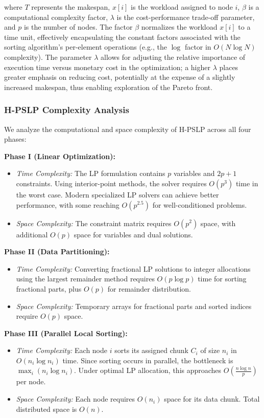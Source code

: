 \documentclass[]{interact}
\theoremstyle{plain}
\theoremstyle{definition}
\theoremstyle{remark}
\begin{document}
where $T$ represents the makespan, $x[i]$ is the workload assigned to node $i$, $\beta$ is a computational complexity factor, $\lambda$ is the cost-performance trade-off parameter, and $p$ is the number of nodes. The factor $\beta$ normalizes the workload $x[i]$ to a time unit, effectively encapsulating the constant factors associated with the sorting algorithm's per-element operations (e.g., the $\log$ factor in $O(N \log N)$ complexity). The parameter $\lambda$ allows for adjusting the relative importance of execution time versus monetary cost in the optimization; a higher $\lambda$ places greater emphasis on reducing cost, potentially at the expense of a slightly increased makespan, thus enabling exploration of the Pareto front.

\subsubsection{H-PSLP Complexity Analysis}

We analyze the computational and space complexity of H-PSLP across all four phases:

\textbf{Phase I (Linear Optimization):}
\begin{itemize}
\item \textit{Time Complexity:} The LP formulation contains $p$ variables and $2p+1$ constraints. Using interior-point methods, the solver requires $O(p^3)$ time in the worst case. Modern specialized LP solvers can achieve better performance, with some reaching $O(p^{2.5})$ for well-conditioned problems.
\item \textit{Space Complexity:} The constraint matrix requires $O(p^2)$ space, with additional $O(p)$ space for variables and dual solutions.
\end{itemize}

\textbf{Phase II (Data Partitioning):}
\begin{itemize}
\item \textit{Time Complexity:} Converting fractional LP solutions to integer allocations using the largest remainder method requires $O(p \log p)$ time for sorting fractional parts, plus $O(p)$ for remainder distribution.
\item \textit{Space Complexity:} Temporary arrays for fractional parts and sorted indices require $O(p)$ space.
\end{itemize}

\textbf{Phase III (Parallel Local Sorting):}
\begin{itemize}
\item \textit{Time Complexity:} Each node $i$ sorts its assigned chunk $C_i$ of size $n_i$ in $O(n_i \log n_i)$ time. Since sorting occurs in parallel, the bottleneck is $\max_i(n_i \log n_i)$. Under optimal LP allocation, this approaches $O(\frac{n \log n}{p})$ per node.
\item \textit{Space Complexity:} Each node requires $O(n_i)$ space for its data chunk. Total distributed space is $O(n)$.
\end{itemize}
\end{document}
